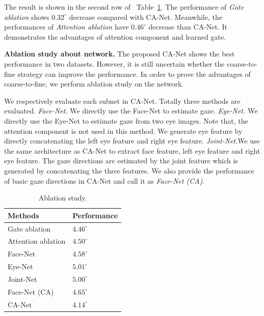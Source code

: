 \documentclass[letterpaper]{article} %
\def\bm #1{\boldsymbol{#1}}%
\newcommand{\Tref}[1]{Table~\ref{#1}}
\begin{document}
The result is shown in the second row of ~\Tref{table:ablation}.
The performance of \emph{Gate ablation} shows $0.32^{\circ}$ decrease compared with CA-Net. 
Meanwhile, the performances of \emph{Attention ablation} have $0.46^{\circ}$ decrease than CA-Net.
It demonstrates the advantages of attention component and learned gate. 

\textbf{Ablation study about network.}
The proposed CA-Net shows the best performance in two datasets. 
However, it is still uncertain whether the coarse-to-fine strategy can improve the performance. 
In order to prove the advantages of coarse-to-fine, we perform ablation study on the network.

We respectively evaluate each subnet in CA-Net. Totally three methods are evaluated. 
\emph{Face-Net.} We directly use the Face-Net to estimate gaze.
\emph{Eye-Net.} We directly use the Eye-Net to estimate gaze from two eye images. Note that, the attention component is not used in this method. We generate eye feature by directly concatenating the left eye feature and right eye feature.
\emph{Joint-Net}.We use the same architecture as CA-Net to extract face feature, left eye feature and right eye feature. The gaze directions are estimated by the joint feature which is generated by concatenating the three features.
We also provide the performance of basic gaze directions in CA-Net and call it as \emph{Face-Net (CA)}.


\begin{table}[t]
	\renewcommand\arraystretch{1.3}
	\normalsize
	\caption{Ablation study.}
	\begin{center}
		\begin{tabular}{|p{4.0cm}<{\centering}|p{3.0cm}<{\centering}|}
			\hline
			Methods & Performance\\
			\hline
			Gate ablation 					&$4.46^{\circ}$				\\
			Attention ablation 			&$4.50^{\circ}$				\\
			
			\hline
			Face-Net				&$4.58^{\circ}$					\\
			Eye-Net				&$5.01^{\circ}$					\\
			Joint-Net		&$5.00^{\circ}$					\\
			Face-Net (CA)	&$4.65^{\circ}$	\\
			\hline
			CA-Net					&$\bm{4.14^{\circ}}$		\\
			\hline
		\end{tabular}
	\end{center}
	\label{table:ablation}
\end{table}
\end{document}

